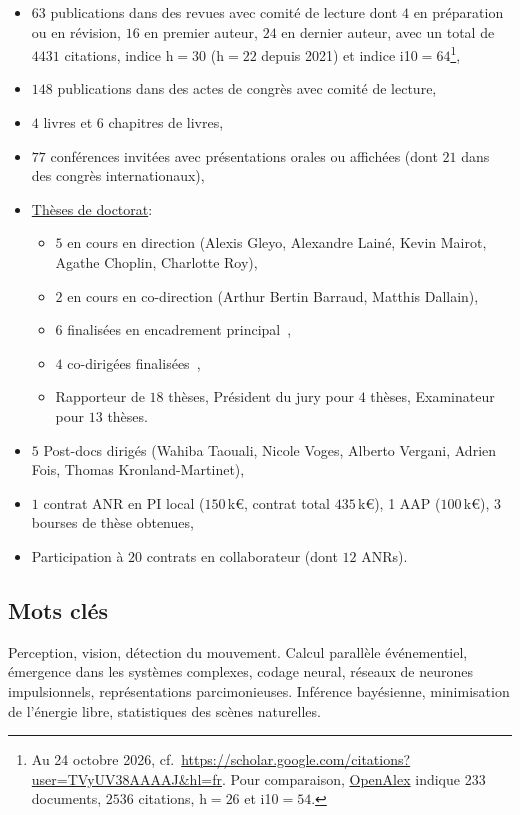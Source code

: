 \documentclass[10pt,french,a4paper,oneside]{article}%
\begin{document}
\begin{itemize}

\item	$63$ publications dans des revues avec comité de lecture dont $4$ en préparation ou en révision, $16$ en premier auteur, $24$ en dernier auteur, avec un total de $4431$ citations, indice h$=30$ (h$=22$ depuis 2021) et indice i10$=64$\footnote{Au 24 octobre 2026, cf.~\url{https://scholar.google.com/citations?user=TVyUV38AAAAJ&hl=fr}. Pour comparaison, \href{https://openalex.org/authors/A5010769763}{OpenAlex} indique 233 documents, $2536$ citations, h$=26$ et i10$=54$.},
\item	$148$ publications dans des actes de congrès avec comité de lecture,
\item	$4$ livres et $6$ chapitres de livres,
\item	$77$ conférences invitées avec présentations orales
ou affichées (dont $21$ dans des congrès internationaux),
\item \href{https://www.theses.fr/074493701}{Thèses de doctorat}:
\begin{itemize}
	\item $5$ en cours en direction (Alexis Gleyo, Alexandre Lainé, Kevin Mairot, Agathe Choplin, Charlotte Roy),
	\item $2$ en cours en co-direction (Arthur Bertin Barraud, Matthis Dallain),
	\item $6$ finalisées en encadrement principal~\citep{Khoei14thesis,Boutin20thesis,Franciosini21thesis,Ladret24thesis,Grimaldi24thesis,Jeremie25thesis},
	\item $4$ co-dirigées finalisées~\citep{Kremkow09thesis,Damasse18thesis,MansourPour19thesis,Gruel23thesis},
	\item Rapporteur de $18$ thèses, Président du jury pour $4$ thèses, Examinateur pour $13$ thèses.
\end{itemize} %
\item $5$ Post-docs dirigés (Wahiba Taouali, Nicole Voges, Alberto Vergani, Adrien Fois, Thomas Kronland-Martinet),
\item $1$ contrat ANR en PI local ($150$\,k€, contrat total $435$\,k€), 1 AAP ($100$\,k€), $3$ bourses de thèse obtenues,
\item Participation à $20$ contrats en collaborateur (dont $12$ ANRs).

\end{itemize} %

\subsection*{Mots clés}
Perception, vision, détection du mouvement. Calcul parallèle événementiel, émergence dans les systèmes complexes, codage neural, réseaux de neurones impulsionnels, représentations parcimonieuses. Inférence bayésienne, minimisation de l'énergie libre, statistiques des scènes naturelles.
\end{document}
